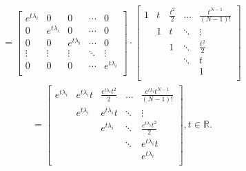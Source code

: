 \documentclass[letterpaper,10pt,english]{jupyterBook}
\begin{document}
\begin{equation*}
\begin{split}
= \left[ {\begin{array}{ccccc}
    e^{t \lambda_i} & 0 & 0 & \dotsm & 0\\
    0 & e^{t \lambda_i} & 0 & \dotsm & 0\\
    0 & 0 & e^{t \lambda_i} & \dotsm & 0\\
    \vdots & \vdots & \vdots & \ddots & \vdots\\
    0 & 0 & 0 & \dotsm & e^{t \lambda_i}\\
\end{array} } \right] \cdot \left[ {\begin{array}{ccccc}
    1 & t & \frac{t^2}{2} & \dotsc & \frac{t^{N-1}}{(N-1)!}\\
     & 1 & t & \ddots & \vdots\\
     &  & 1 & \ddots & \frac{t^2}{2} \\
     &  &  & \ddots & t \\
     &  &  &  & 1 \\
\end{array} } \right]
\end{split}
\end{equation*}\begin{equation*}
\begin{split}
= \left[ {\begin{array}{ccccc}
    e^{t \lambda_i} & e^{t \lambda_i}t & \frac{e^{t \lambda_i} t^2}{2} & \dotsc & \frac{e^{t \lambda_i} t^{N-1}}{(N-1)!}\\
     & e^{t \lambda_i} & e^{t \lambda_i} t & \ddots & \vdots\\
     &  & e^{t \lambda_i} & \ddots & \frac{e^{t \lambda_i} t^2}{2} \\
     &  &  & \ddots & e^{t \lambda_i} t \\
     &  &  &  & e^{t \lambda_i} \\
\end{array} } \right], t \in \mathbb{R}.
\end{split}
\end{equation*}
\end{document}
